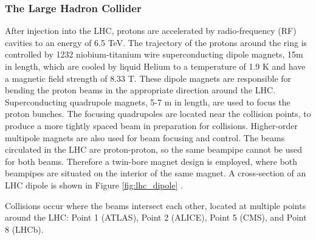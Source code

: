 \subsubsection{The Large Hadron Collider}
After injection into the LHC, protons are accelerated by radio-frequency (RF) cavities to an energy of 6.5 TeV. 
The trajectory of the protons around the ring is controlled by 1232 niobium-titanium wire superconducting dipole magnets, 15m in length, which are cooled by liquid Helium to a temperature of 1.9 K and have a magnetic field strength of 8.33 T. These dipole magnets are responsible for bending the proton beams in the appropriate direction around the LHC. Superconducting quadrupole magnets, 5-7 m in length, are used to focus the proton bunches.  The focusing quadrupoles are located near the collision points, to produce a more tightly spaced beam in preparation for collisions. Higher-order multipole magnets are also used for beam focusing and control. 
The beams circulated in the LHC are proton-proton, so the same beampipe cannot be used for both beams. Therefore a twin-bore magnet design is employed, where both beampipes are situated on the interior of the same magnet. A cross-section of an LHC dipole is shown in Figure \ref{fig:lhc_dipole} \cite{Bruning:2004ej}.


Collisions occur where the beams intersect each other, located at multiple points around the LHC: Point 1 (ATLAS), Point 2 (ALICE), Point 5 (CMS), and Point 8 (LHCb). 